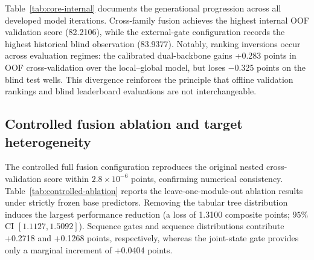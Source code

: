 \documentclass[preprint,12pt,nopreprintline]{elsarticle}
\begin{document}
\begin{table}[htbp]
\centering
\caption{Historical model-family development record on the internal industrial benchmark. Note that OOF scores are row-specific, and blind scores reflect official historical platform observations under differing development estimators.}
\label{tab:core-internal}
\end{table}

\newpage
Table~\ref{tab:core-internal} documents the generational progression across all developed model iterations. Cross-family fusion achieves the highest internal OOF validation score (82.2106), while the external-gate configuration records the highest historical blind observation (83.9377). Notably, ranking inversions occur across evaluation regimes: the calibrated dual-backbone gains +0.283 points in OOF cross-validation over the local--global model, but loses $-$0.325 points on the blind test wells. This divergence reinforces the principle that offline validation rankings and blind leaderboard evaluations are not interchangeable.

\subsection{Controlled fusion ablation and target heterogeneity}
The controlled full fusion configuration reproduces the original nested cross-validation score within $2.8 \times 10^{-6}$ points, confirming numerical consistency. Table~\ref{tab:controlled-ablation} reports the leave-one-module-out ablation results under strictly frozen base predictors. Removing the tabular tree distribution induces the largest performance reduction (a loss of 1.3100 composite points; $95\%$ CI $[1.1127, 1.5092]$). Sequence gates and sequence distributions contribute +0.2718 and +0.1268 points, respectively, whereas the joint-state gate provides only a marginal increment of +0.0404 points.
\end{document}
